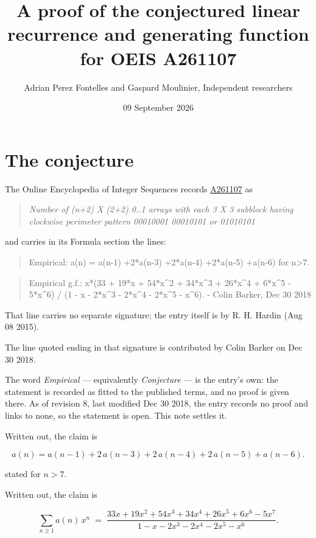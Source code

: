 \documentclass[11pt]{article}
\title{A proof of the conjectured linear recurrence and generating function for OEIS A261107}
\author{Adrian Perez Fontelles and Gaspard Moulinier, Independent researchers}
\date{09 September 2026}
\theoremstyle{definition}
\begin{document}
\maketitle
\section{The conjecture}

The Online Encyclopedia of Integer Sequences records \href{https://oeis.org/A261107}{A261107} as

\begin{quote}\itshape Number of (n+2) X (2+2) 0..1 arrays with each 3 X 3 subblock having clockwise perimeter pattern 00010001 00010101 or 01010101\end{quote}

and carries in its Formula section the lines:

\begin{quote}\ttfamily Empirical: a(n) = a(n-1) +2*a(n-3) +2*a(n-4) +2*a(n-5) +a(n-6) for n>7.\end{quote}

\begin{quote}\ttfamily Empirical g.f.: x*(33 + 19*x + 54*x\textasciicircum{}2 + 34*x\textasciicircum{}3 + 26*x\textasciicircum{}4 + 6*x\textasciicircum{}5 - 5*x\textasciicircum{}6) / (1 - x - 2*x\textasciicircum{}3 - 2*x\textasciicircum{}4 - 2*x\textasciicircum{}5 - x\textasciicircum{}6). - Colin Barker, Dec 30 2018\end{quote}

That line carries no separate signature; the entry itself is by R. H. Hardin (Aug 08 2015).

The line quoted ending in that signature is contributed by Colin Barker on Dec 30 2018.

The word {\itshape Empirical} --- equivalently {\itshape Conjecture} --- is the entry's own: the statement is recorded as fitted to the published terms, and no proof is given there. As of revision 8, last modified Dec 30 2018, the entry records no proof and links to none, so the statement is open. This note settles it.

Written out, the claim is

\[a(n) = a(n-1) + 2\,a(n-3) + 2\,a(n-4) + 2\,a(n-5) + a(n-6).\]

stated for $n > 7$.

Written out, the claim is

\[\sum_{n \ge 1} a(n)\,x^n \;=\; \frac{33x + 19x^{2} + 54x^{3} + 34x^{4} + 26x^{5} + 6x^{6} - 5x^{7}}{1 - x - 2x^{3} - 2x^{4} - 2x^{5} - x^{6}}.\]
\end{document}
